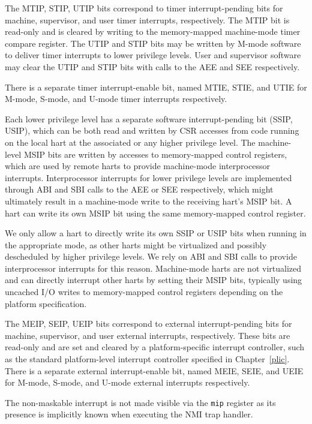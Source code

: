 The MTIP, STIP, UTIP bits correspond to timer interrupt-pending bits
for machine, supervisor, and user timer interrupts, respectively.  The
MTIP bit is read-only and is cleared by writing to the memory-mapped
machine-mode timer compare register.  The UTIP and STIP bits may be
written by M-mode software to deliver timer interrupts to lower
privilege levels.  User and supervisor software may clear the UTIP and
STIP bits with calls to the AEE and SEE respectively.

There is a separate timer interrupt-enable bit, named MTIE, STIE, and
UTIE for M-mode, S-mode, and U-mode timer interrupts respectively.

Each lower privilege level has a separate software interrupt-pending
bit (SSIP, USIP), which can be both read and written by CSR accesses
from code running on the local hart at the associated or any higher
privilege level. The machine-level MSIP bits are written by accesses
to memory-mapped control registers, which are used by remote harts to
provide machine-mode interprocessor interrupts.  Interprocessor
interrupts for lower privilege levels are implemented through ABI and
SBI calls to the AEE or SEE respectively, which might ultimately
result in a machine-mode write to the receiving hart's MSIP bit.  A
hart can write its own MSIP bit using the same memory-mapped control
register.

\begin{commentary}
We only allow a hart to directly write its own SSIP or USIP
bits when running in the appropriate mode, as other harts might be
virtualized and possibly descheduled by higher privilege levels.  We
rely on ABI and SBI calls to provide interprocessor interrupts
for this reason.  Machine-mode harts are not virtualized and can
directly interrupt other harts by setting their MSIP bits, typically
using uncached I/O writes to memory-mapped control registers depending
on the platform specification.
\end{commentary}

The MEIP, SEIP, UEIP bits correspond to external interrupt-pending
bits for machine, supervisor, and user external interrupts,
respectively.  These bits are read-only and are set and cleared by a
platform-specific interrupt controller, such as the standard
platform-level interrupt controller specified in Chapter~\ref{plic}.
There is a separate external interrupt-enable bit, named MEIE, SEIE,
and UEIE for M-mode, S-mode, and U-mode external interrupts
respectively.

\begin{commentary}
The non-maskable interrupt is not made visible via the {\tt mip}
register as its presence is implicitly known when executing the NMI
trap handler.
\end{commentary}


